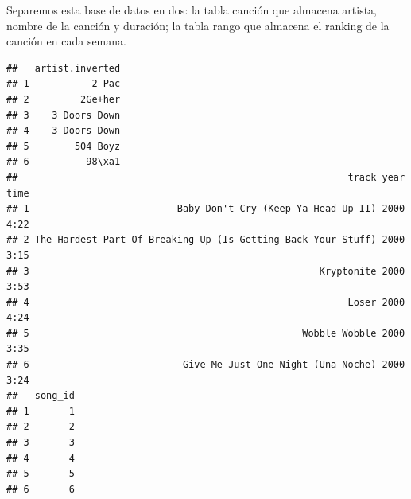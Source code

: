 \documentclass[]{article}
\newenvironment{Shaded}{\begin{snugshade}}{\end{snugshade}}
\newcommand{\KeywordTok}[1]{\textcolor[rgb]{0.13,0.29,0.53}{\textbf{{#1}}}}
\newcommand{\DataTypeTok}[1]{\textcolor[rgb]{0.13,0.29,0.53}{{#1}}}
\newcommand{\StringTok}[1]{\textcolor[rgb]{0.31,0.60,0.02}{{#1}}}
\newcommand{\NormalTok}[1]{{#1}}
\begin{document}
Separemos esta base de datos en dos: la tabla canción que almacena
artista, nombre de la canción y duración; la tabla rango que almacena el
ranking de la canción en cada semana.

\begin{Shaded}
\end{Shaded}

\begin{verbatim}
##   artist.inverted
## 1           2 Pac
## 2         2Ge+her
## 3    3 Doors Down
## 4    3 Doors Down
## 5        504 Boyz
## 6          98\xa1
##                                                          track year time
## 1                          Baby Don't Cry (Keep Ya Head Up II) 2000 4:22
## 2 The Hardest Part Of Breaking Up (Is Getting Back Your Stuff) 2000 3:15
## 3                                                   Kryptonite 2000 3:53
## 4                                                        Loser 2000 4:24
## 5                                                Wobble Wobble 2000 3:35
## 6                           Give Me Just One Night (Una Noche) 2000 3:24
##   song_id
## 1       1
## 2       2
## 3       3
## 4       4
## 5       5
## 6       6
\end{verbatim}

\begin{Shaded}
\end{Shaded}
\end{document}
